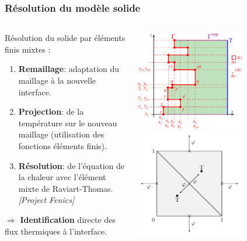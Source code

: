 \documentclass{beamer}
\newcommand{\bib}[1]{{\color{cea_texte!80}\tiny\textit{[#1]}}}
\begin{document}
\begin{frame}
    \frametitle{Résolution du modèle solide}
    \footnotesize


\begin{columns}[c]
	\begin{column}{0.6\textwidth}
	\begin{ceablock}{Résolution du solide par éléments finis mixtes :}
\begin{enumerate}
			\item \textbf{Remaillage}: adaptation du maillage à la nouvelle interface.
			\item \textbf{Projection}: de la température sur le nouveau maillage (utilisation des fonctions éléments finis).
			\item \textbf{Résolution}: de l'équation de la chaleur avec l'élément mixte de Raviart-Thomas. \bib{Project Fenics}
		\end{enumerate}
\center $\Rightarrow$ \textbf{Identification} directe des flux thermiques à l'interface.
		\end{ceablock}
	\end{column}
	\begin{column}{0.5\textwidth}
	\center
		\includegraphics[width=0.65\textwidth]{Figures/crust_mesh.pdf}\\
		\includegraphics[width=0.65\textwidth]{Figures/elementFiniMixte2.pdf}

		
			\end{column}

	\end{columns}

\end{frame}
\end{document}
